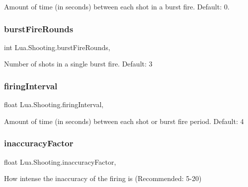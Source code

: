 Amount of time (in seconds) between each shot in a burst fire. Default\+: 0. 

\mbox{\label{class_lua_1_1_shooting_a41ac94c6ba5c407bd0fcbf0f6e938fd1}} 
\subsubsection{\texorpdfstring{burstFireRounds}{burstFireRounds}}
{\footnotesize\ttfamily int Lua.\+Shooting.\+burst\+Fire\+Rounds\hspace{0.3cm}{\ttfamily [get]}, {\ttfamily [set]}}



Number of shots in a single burst fire. Default\+: 3 

\mbox{\label{class_lua_1_1_shooting_aece1867c834c0c4fc31af53c55c8040e}} 
\subsubsection{\texorpdfstring{firingInterval}{firingInterval}}
{\footnotesize\ttfamily float Lua.\+Shooting.\+firing\+Interval\hspace{0.3cm}{\ttfamily [get]}, {\ttfamily [set]}}



Amount of time (in seconds) between each shot or burst fire period. Default\+: 4 

\mbox{\label{class_lua_1_1_shooting_a7f8c04173b4649a5b6134344e67dc10a}} 
\subsubsection{\texorpdfstring{inaccuracyFactor}{inaccuracyFactor}}
{\footnotesize\ttfamily float Lua.\+Shooting.\+inaccuracy\+Factor\hspace{0.3cm}{\ttfamily [get]}, {\ttfamily [set]}}



How intense the inaccuracy of the firing is (Recommended\+: 5-\/20) 

